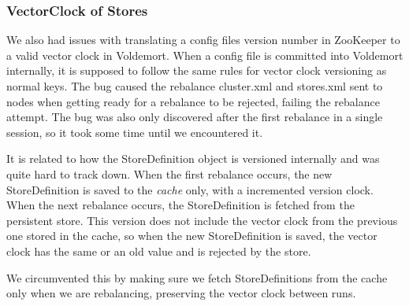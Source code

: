 \subsubsection{VectorClock of Stores}
We also had issues with translating a config files version number in ZooKeeper to a valid vector clock in Voldemort. When a config file is committed into Voldemort internally, it is supposed to follow the same rules for vector clock versioning as normal keys.
The bug caused the rebalance cluster.xml and stores.xml sent to nodes when getting ready for a rebalance to be rejected, failing the rebalance attempt.
The bug was also only discovered after the first rebalance in a single session, so it took some time until we encountered it.

It is related to how the StoreDefinition object is versioned internally and was quite hard to track down. When the first rebalance occurs, the new StoreDefinition is saved to the \emph{cache} only, with a incremented version clock. When the next rebalance occurs, the StoreDefinition is fetched from the persistent store. This version does not include the vector clock from the previous one stored in the cache, so when the new StoreDefinition is saved, the vector clock has the same or an old value and is rejected by the store.

We circumvented this by making sure we fetch StoreDefinitions from the cache only when we are rebalancing, preserving the vector clock between runs.


